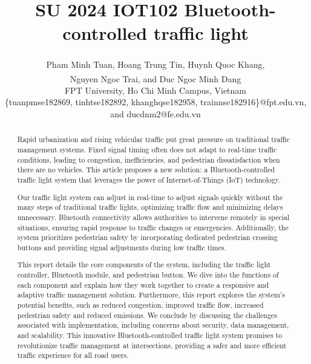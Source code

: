 \documentclass[conference, onecolumn]{IEEEtran}
\begin{document}
\title{SU 2024 IOT102 Bluetooth-controlled traffic light\\
}

\author{
\textsuperscript{} Pham Minh Tuan, \textsuperscript{} Hoang Trung Tin, \textsuperscript{} Huynh Quoc Khang,\\ \textsuperscript{} Nguyen Ngoc Trai, and Duc Ngoc Minh Dang\\
FPT University, Ho Chi Minh Campus, Vietnam\\
\{tuanpmse182869, tinhtse182892, khanghqse182958, trainnse182916\}@fpt.edu.vn, and ducdnm2@fe.edu.vn}
\maketitle

\begin{abstract}

Rapid urbanization and rising vehicular traffic put great pressure on traditional traffic management systems. Fixed signal timing often does not adapt to real-time traffic conditions, leading to congestion, inefficiencies, and pedestrian dissatisfaction when there are no vehicles. This article proposes a new solution: a Bluetooth-controlled traffic light system that leverages the power of Internet-of-Things (IoT) technology.\par

Our traffic light system can adjust in real-time to adjust signals quickly without the many steps of traditional traffic lights, optimizing traffic flow and minimizing delays unnecessary. Bluetooth connectivity allows authorities to intervene remotely in special situations, ensuring rapid response to traffic changes or emergencies. Additionally, the system prioritizes pedestrian safety by incorporating dedicated pedestrian crossing buttons and providing signal adjustments during low traffic times.\par

This report details the core components of the system, including the traffic light controller, Bluetooth module, and pedestrian button. We dive into the functions of each component and explain how they work together to create a responsive and adaptive traffic management solution. Furthermore, this report explores the system's potential benefits, such as reduced congestion, improved traffic flow, increased pedestrian safety and reduced emissions. We conclude by discussing the challenges associated with implementation, including concerns about security, data management, and scalability. This innovative Bluetooth-controlled traffic light system promises to revolutionize traffic management at intersections, providing a safer and more efficient traffic experience for all road users.\par

\end{abstract}
\end{document}
